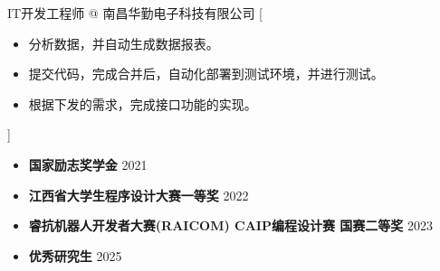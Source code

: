 \documentclass[zh]{resume}
\begin{document}
\begin{experiences}
    {IT开发工程师 @ 南昌华勤电子科技有限公司}%
    [\begin{itemize}
      \item 分析数据，并自动生成数据报表。
      \item 提交代码，完成合并后，自动化部署到测试环境，并进行测试。
      \item 根据下发的需求，完成接口功能的实现。
    \end{itemize}]

\end{experiences}


\begin{itemize}
  \item \textbf{国家励志奖学金} \hfill 2021
  \item \textbf{江西省大学生程序设计大赛一等奖 }	\hfill 2022
  \item \textbf{睿抗机器人开发者大赛(RAICOM) CAIP编程设计赛 国赛二等奖} \hfill 2023
  \item \textbf{优秀研究生} \hfill 2025
\end{itemize}
\end{document}
